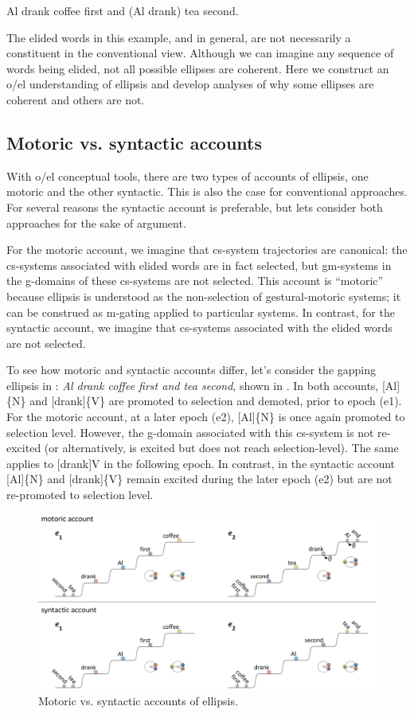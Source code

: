 \ea\label{ex:7:1x}
  {Al drank coffee first and} (Al drank) tea second.
\z

  The elided words in this example, and in general, are not necessarily a constituent in the conventional view. Although we can imagine any sequence of words being elided, not all possible ellipses are coherent. Here we construct an o/el understanding of ellipsis and develop analyses of why some ellipses are coherent and others are not.

\subsection{Motoric vs. syntactic accounts}

With o/el conceptual tools, there are two types of accounts of ellipsis, one motoric and the other syntactic. This is also the case for conventional approaches. For several reasons the syntactic account is preferable, but lets consider both approaches for the sake of argument. 

  For the motoric account, we imagine that cs-system trajectories are canonical: the cs-systems associated with elided words are in fact selected, but gm-systems in the g-domains of these cs-systems are not selected. This account is “motoric” because ellipsis is understood as the non-selection of gestural-motoric systems; it can be construed as m-gating applied to particular systems. In contrast, for the syntactic account, we imagine that cs-systems associated with the elided words are not selected.

  To see how motoric and syntactic accounts differ, let's consider the gapping ellipsis in : \textit{Al drank coffee first and tea second}, shown in {}. In both accounts, [Al]\{N\} and [drank]\{V\} are promoted to selection and demoted, prior to epoch (e1). For the motoric account, at a later epoch (e2), [Al]\{N\} is once again promoted to selection level. However, the g-domain associated with this cs-system is not re-excited (or alternatively, is excited but does not reach selection-level). The same applies to [drank]{V} in the following epoch. In contrast, in the syntactic account [Al]\{N\} and [drank]\{V\} remain excited during the later epoch (e2) but are not re-promoted to selection level. 

  
\begin{figure}
\includegraphics[width=\textwidth]{figures/Tilsen-img145.png}
\caption{Motoric vs. syntactic accounts of ellipsis.}
\label{fig:7:1}
\end{figure}
 

